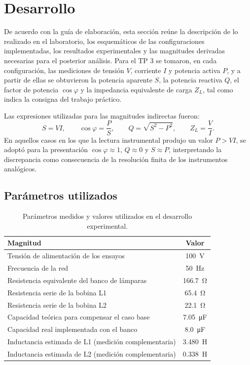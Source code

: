\documentclass[a4paper,12pt]{article}
\begin{document}
\section{Desarrollo}

De acuerdo con la guía de elaboración, esta sección reúne la descripción de lo realizado en el laboratorio, los esquemáticos de las configuraciones implementadas, los resultados experimentales y las magnitudes derivadas necesarias para el posterior análisis. Para el TP 3 se tomaron, en cada configuración, las mediciones de tensión \(V\), corriente \(I\) y potencia activa \(P\), y a partir de ellas se obtuvieron la potencia aparente \(S\), la potencia reactiva \(Q\), el factor de potencia \(\cos\varphi\) y la impedancia equivalente de carga \(Z_L\), tal como indica la consigna del trabajo práctico.

Las expresiones utilizadas para las magnitudes indirectas fueron:
\[
S = VI,\qquad
\cos\varphi = \frac{P}{S},\qquad
Q = \sqrt{S^2-P^2},\qquad
Z_L = \frac{V}{I}.
\]
En aquellos casos en los que la lectura instrumental produjo un valor \(P>VI\), se adoptó para la presentación \(\cos\varphi \approx 1\), \(Q\approx 0\) y \(S\approx P\), interpretando la discrepancia como consecuencia de la resolución finita de los instrumentos analógicos.

\subsection{Parámetros utilizados}

\begin{table}[H]
    \centering
    \caption{Parámetros medidos y valores utilizados en el desarrollo experimental.}
    \label{tab:parametros_tp3}
    \begin{tabular}{>{\raggedright\arraybackslash}p{}c}
        \toprule
        Magnitud & Valor \\
        \midrule
        Tensión de alimentación de los ensayos & \SI{100}{\volt} \\
        Frecuencia de la red & \SI{50}{\hertz} \\
        Resistencia equivalente del banco de lámparas & \SI{166,7}{\ohm} \\
        Resistencia serie de la bobina L1 & \SI{65,4}{\ohm} \\
        Resistencia serie de la bobina L2 & \SI{22,1}{\ohm} \\
        Capacidad teórica para compensar el caso base & \SI{7,05}{\micro\farad} \\
        Capacidad real implementada con el banco & \SI{8,0}{\micro\farad} \\
        Inductancia estimada de L1 (medición complementaria) & \SI{3,480}{\henry} \\
        Inductancia estimada de L2 (medición complementaria) & \SI{0,338}{\henry} \\
        \bottomrule
    \end{tabular}
\end{table}
\end{document}
